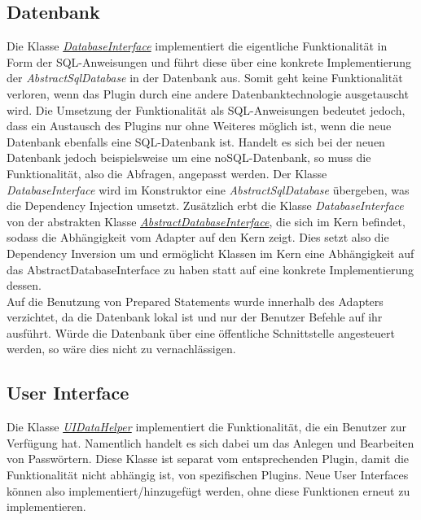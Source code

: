 \subsection{Datenbank}
Die Klasse \href{https://github.com/moorts/Morik/blob/main/src/adapters/database/DatabaseInterface.h}{\textit{DatabaseInterface}} implementiert die eigentliche Funktionalität in Form der SQL-Anweisungen und führt diese über eine konkrete Implementierung der \textit{AbstractSqlDatabase} in der Datenbank aus. Somit geht keine Funktionalität verloren, wenn das Plugin durch eine andere Datenbanktechnologie ausgetauscht wird. Die Umsetzung der Funktionalität als SQL-Anweisungen bedeutet jedoch, dass ein Austausch des Plugins nur ohne Weiteres möglich ist, wenn die neue Datenbank ebenfalls eine SQL-Datenbank ist. Handelt es sich bei der neuen Datenbank jedoch beispielsweise um eine noSQL-Datenbank, so muss die Funktionalität, also die Abfragen, angepasst werden. Der Klasse \textit{DatabaseInterface} wird im Konstruktor eine \textit{AbstractSqlDatabase} übergeben, was die Dependency Injection umsetzt. Zusätzlich erbt die Klasse \textit{DatabaseInterface} von der abstrakten Klasse \href{https://github.com/moorts/Morik/blob/main/src/application/AbstractDatabaseInterface.h}{\textit{AbstractDatabaseInterface}}, die sich im Kern befindet, sodass die Abhängigkeit vom Adapter auf den Kern zeigt. Dies setzt also die Dependency Inversion um und ermöglicht Klassen im Kern eine Abhängigkeit auf das AbstractDatabaseInterface zu haben statt auf eine konkrete Implementierung dessen.\\
Auf die Benutzung von Prepared Statements wurde innerhalb des Adapters verzichtet, da die Datenbank lokal ist und nur der Benutzer Befehle auf ihr ausführt. Würde die Datenbank über eine öffentliche Schnittstelle angesteuert werden, so wäre dies nicht zu vernachlässigen.

\subsection{User Interface}

Die Klasse \href{https://github.com/moorts/Morik/blob/main/src/adapters/ui/UiDataHelper.h}{\textit{UIDataHelper}} implementiert die Funktionalität, die ein Benutzer zur Verfügung hat. Namentlich handelt es sich dabei um das Anlegen und Bearbeiten von Passwörtern. Diese Klasse ist separat vom entsprechenden Plugin, damit die Funktionalität nicht abhängig ist, von spezifischen Plugins. Neue User Interfaces können also implementiert/hinzugefügt werden, ohne diese Funktionen erneut zu implementieren.


